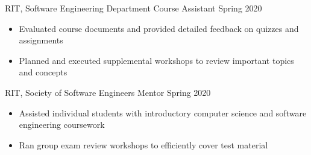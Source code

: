 \documentclass{awesome-cv}
\begin{document}
	\vspace{-0.1cm}
		\begin{cventries}
			\vspace{-0.1cm}
			
			\cventry
				{RIT, Software Engineering Department}
				{Course Assistant\small{\textnormal{\color{graytext}{, Introduction to Software Engineering}}}}
				{Spring 2020}
				{}
				{
					\vspace{-0.3cm}
					\begin{itemize}[nosep]
						\item Evaluated course documents and provided detailed feedback on quizzes and assignments
						\item Planned and executed supplemental workshops to review important topics and concepts
					\end{itemize}
					\vspace{-0.5cm}
				}
				
			\cventry
				{RIT, Society of Software Engineers}
				{Mentor}
				{Spring 2020}
				{}
				{
					\vspace{-0.3cm}
					\begin{itemize}[nosep]
						\item Assisted individual students with introductory computer science and software engineering coursework
						\item Ran group exam review workshops to efficiently cover test material
					\end{itemize}
					\vspace{-0.5cm}
				}	
		\end{cventries}

		

			
\end{document}
